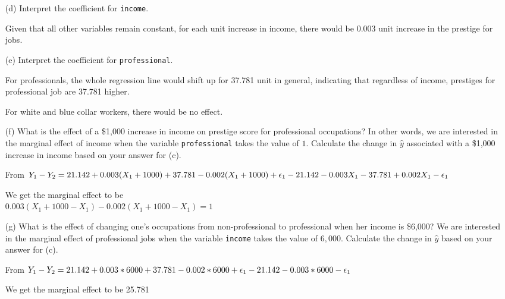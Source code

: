 \documentclass[12pt,letterpaper]{article}
\begin{document}
\begin{enumerate}
	\item [(d)]
	Interpret the coefficient for \texttt{income}.
	
	Given that all other variables remain constant, for each unit increase in income, there would be 0.003 unit increase in the prestige for jobs.
	
	\vspace{.5cm}	
	\item [(e)]
	Interpret the coefficient for \texttt{professional}.
	
	For professionals, the whole regression line would shift up for 37.781 unit in general, indicating that regardless of income, prestiges for professional job are 37.781 higher.
	
	For white and blue collar workers, there would be no effect.
	
	\vspace{.5cm}

	\item [(f)]
	What is the effect of a \$1,000 increase in income on prestige score for professional occupations? In other words, we are interested in the marginal effect of income when the variable \texttt{professional} takes the value of $1$. Calculate the change in $\hat{y}$ associated with a \$1,000 increase in income based on your answer for (c).
	
	From $Y_1 - Y_2 = 21.142 + 0.003(X_1 + 1000) + 37.781 - 0.002(X_1 + 1000) + \epsilon_1 
	\\- 21.142 - 0.003X_1 - 37.781 + 0.002X_1 - \epsilon_1$ 
	
	We get the marginal effect to be
	\\$0.003(X_1 + 1000 - X_1) - 0.002(X_1 + 1000 - X_1) = 1$
		
	\vspace{.5cm}
		
	\item [(g)]
	What is the effect of changing one's occupations from non-professional to professional when her income is \$6,000? We are interested in the marginal effect of professional jobs when the variable \texttt{income} takes the value of $6,000$. Calculate the change in $\hat{y}$ based on your answer for (c).

	From $Y_1 - Y_2 = 21.142 + 0.003*6000 + 37.781 - 0.002*6000 + \epsilon_1 
	\\- 21.142 - 0.003*6000 - \epsilon_1$ 

	We get the marginal effect to be 25.781
		
 	\vspace{.5cm}	
\end{enumerate}
\end{document}
